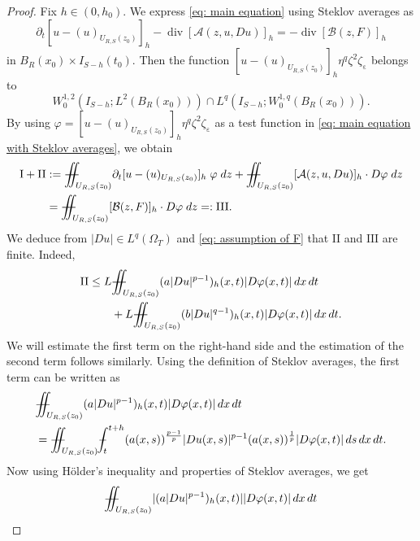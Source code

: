 \documentclass[11pt,oneside, english,reqno,twoside a4paper]{amsart}
\theoremstyle{definition}
\numberwithin{theorem}{section}
\numberwithin{equation}{section}
\def\Xint#1{\mathchoice
	{\XXint\displaystyle\textstyle{#1}}%
	{\XXint\textstyle\scriptstyle{#1}}%
	{\XXint\scriptstyle\scriptscriptstyle{#1}}%
	{\XXint\scriptscriptstyle\scriptscriptstyle{#1}}%
	\!\int}
\def\XXint#1#2#3{{\setbox0=\hbox{$#1{#2#3}{\int}$}
		\vcenter{\hbox{$#2#3$}}\kern-.50\wd0}}
\def\dashint{\Xint-}
\newcommand{\iintss}{{\int\hspace{-0.28cm}\int}}
\newcommand{ \miints }{{\iintss\hspace{-0.56cm} -\hspace{-0.15cm}-}}
\newcommand{\miint}[1]{{\miints_{\hspace{-0.13cm}#1}}}
\begin{document}
\begin{proof}
    Fix $h\in(0,h_0)$. We express \eqref{eq: main equation} using Steklov averages as
    \begin{equation}    \label{eq: main equation with Steklov averages}
        \partial_t[u-(u)_{U_{R, S}(z_0)}]_h-\operatorname*{div}[\mathcal{A}(z, u,D u)]_h=-\operatorname*{div}[\mathcal{B}(z,F)]_h
    \end{equation}
    in $B_R(x_0)\times I_{S-h}(t_0)$. Then the function $[u-(u)_{U_{R,S}(z_0)}]_h \eta^q\zeta^2\zeta_\upepsilon$ belongs to 
    $$
    W^{1,2}_0(I_{S-h};L^2(B_R(x_0)))\cap L^q(I_{S-h};W^{1,q}_0(B_R(x_0))).
    $$
    By using $\varphi=[u-(u)_{U_{R, S}(z_0)}]_h \eta^q \zeta^2 \zeta_\upepsilon$ as a test function in \eqref{eq: main equation with Steklov averages}, we obtain
    \begin{equation*}
        \begin{aligned}
            \mathrm{I}+\mathrm{II}&:=\miint{U_{R, S}(z_0)} \partial_t[u-(u)_{U_{R, S}(z_0)}]_h \; \varphi \; d z+\miint{U_{R, S}(z_0)}[\mathcal{A}(z,u, D u)]_h \cdot D \varphi \; d z \\
            &=\miint{U_{R, S}(z_0)}[\mathcal{B}(z,F) ]_h \cdot D \varphi\; d z=: \mathrm{III}.
        \end{aligned}
    \end{equation*}
    We deduce from $|D u| \in L^q(\Omega_T)$ and \eqref{eq: assumption of F} that $\mathrm{II}$ and $\mathrm{III}$ are finite. Indeed, 
    \begin{align}
      \nonumber \mathrm{II} & \leq L \miint{U_{R, S}(z_0)}(a |Du|^{p-1})_h(x,t)|D\varphi(x,t)|\,dx\,dt \\
      &\label{finiteness of II} \qquad +L \miint{U_{R, S}(z_0)}(b |Du|^{q-1})_h(x,t)|D\varphi(x,t)|\,dx\,dt. 
    \end{align}
We will estimate the first term on the right-hand side and the estimation of the second term follows similarly. Using the definition of Steklov averages, the first term can be written as
\begin{align*}
&\miint{U_{R, S}(z_0)}(a |Du|^{p-1})_h(x,t)|D\varphi(x,t)|\,dx\,dt\\
&=\miint{U_{R, S}(z_0)}\dashint_{t}^{t+h}(a(x,s))^{\frac{p-1}{p}}|Du(x,s)|^{p-1}(a(x,s))^{\frac{1}{p}}|D\varphi(x,t)|\,ds\,dx\,dt.
\end{align*}
Now using H\"{o}lder's inequality and properties of Steklov averages, we get
\begin{align*}
&\miint{U_{R, S}(z_0)}|(a |Du|^{p-1})_h(x,t)||D\varphi(x,t)|\,dx\,dt \\

\end{align*}
\end{proof}
\end{document}
